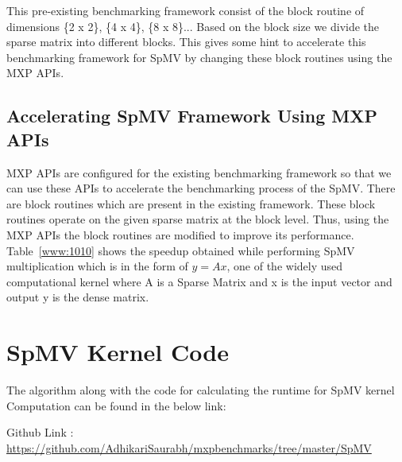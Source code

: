 

This pre-existing benchmarking framework consist of the block routine of dimensions \{2 x 2\}, \{4 x 4\}, \{8 x 8\}... Based on the block size we divide the sparse matrix into different blocks. This gives some hint to accelerate this benchmarking framework for SpMV by changing these block routines using the MXP APIs.


\subsection{Accelerating SpMV Framework Using MXP APIs}

MXP APIs are configured for the existing benchmarking framework so that we can use these APIs to accelerate the benchmarking process of the SpMV. There are block routines which are present in the existing framework. These block routines operate on the given sparse matrix at the block level. Thus, using the MXP APIs the block routines are modified to improve its performance.  Table~\ref{www:1010} shows the speedup obtained while performing SpMV multiplication which is in the form of $y = Ax$, one of the widely used computational kernel where A is a Sparse Matrix and x is the input vector and output y is the dense matrix.




\section{SpMV Kernel Code}

The algorithm along with the code for calculating the runtime for SpMV kernel Computation can be found in the below link:

Github Link : \url{https://github.com/AdhikariSaurabh/mxpbenchmarks/tree/master/SpMV}






